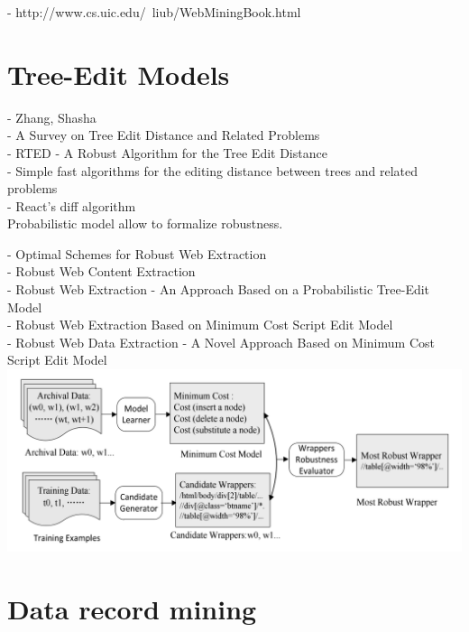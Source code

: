 \cite{Thomsen:2012:WWS:2364120.2364156}

- http://www.cs.uic.edu/~liub/WebMiningBook.html\\


\section{Tree-Edit Models}

- Zhang, Shasha\\
- A Survey on Tree Edit Distance and Related Problems\\
- RTED - A Robust Algorithm for the Tree Edit Distance\\
- Simple fast algorithms for the editing distance between trees and related problems\\
- React’s diff algorithm\\

Probabilistic model allow to formalize robustness.

- Optimal Schemes for Robust Web Extraction\\
- Robust Web Content Extraction\\
- Robust Web Extraction - An Approach Based on a Probabilistic Tree-Edit Model\\
- Robust Web Extraction Based on Minimum Cost Script Edit Model\\
- Robust Web Data Extraction - A Novel Approach Based on Minimum Cost Script Edit Model\\

\includegraphics[width=\linewidth]{figures/robust-web-extraction-framework}


\section{Data record mining}

